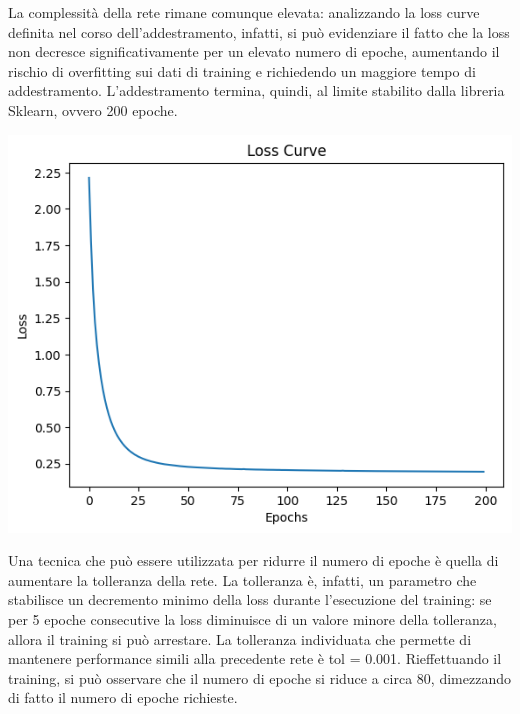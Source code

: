La complessità della rete rimane comunque elevata: analizzando la loss curve
definita nel corso dell'addestramento, infatti, si può evidenziare il fatto
che la loss non decresce significativamente per un elevato numero di epoche,
aumentando il rischio di overfitting sui dati di training e richiedendo un maggiore
tempo di addestramento. L'addestramento termina, quindi, al limite stabilito
dalla libreria Sklearn, ovvero 200 epoche.

\begin{Figure}
    \centering
    \includegraphics[width=0.9\linewidth]{img/mlp_low_loss.png}
\end{Figure}

Una tecnica che può essere utilizzata per ridurre il numero di epoche
è quella di aumentare la tolleranza della rete.
La tolleranza è, infatti, un parametro che stabilisce un decremento minimo
della loss durante l'esecuzione del training: se per 5 epoche consecutive la loss
diminuisce di un valore minore della tolleranza, allora il training si può
arrestare.
La tolleranza individuata che permette di mantenere performance simili alla
precedente rete è tol = 0.001. Rieffettuando il training, si può osservare che 
il numero di epoche si riduce a circa 80, dimezzando di fatto il numero
di epoche richieste.

